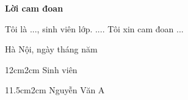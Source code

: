 \setcounter{page}{1}
\begin{center}
\textbf{\large{Lời cam đoan}	}
\end{center}
Tôi là ..., sinh viên lớp. .... Tôi xin cam đoan ...

\begin{flushright}
Hà Nội, ngày    tháng     năm
\end{flushright}

\begin{changemargin}{12cm}{2cm}
Sinh viên
\\[2cm]
\end{changemargin}

\begin{changemargin}{11.5cm}{2cm}
Nguyễn Văn A
\end{changemargin}
